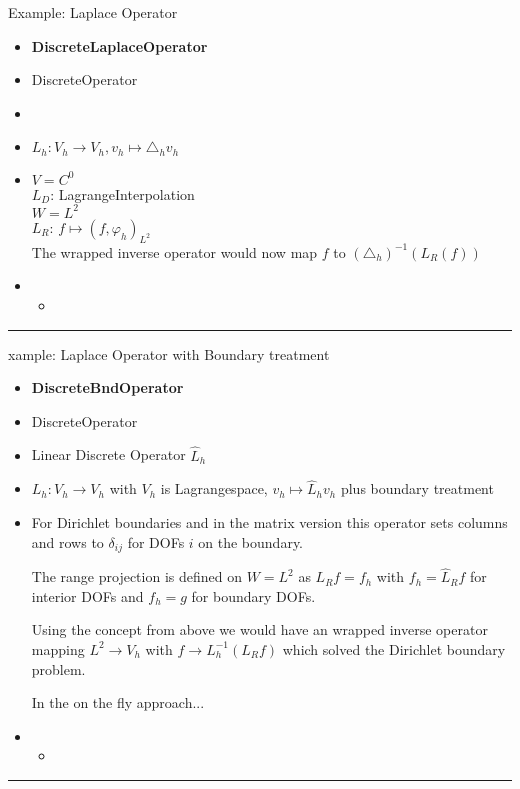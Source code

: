 \documentclass[10pt,a4paper]{article}
\newenvironment{interface}[5]%
{\begin{itemize}
 \item[Interface] {\bf #1}
 \item[is-a] #2 
 \item[argument] #3
 \item[models] #4
 \item[concept] #5
 \item[Methods and typedefs] 
\begin{itemize}}%
{\end{itemize}\end{itemize}\rule{\textwidth}{.4pt}}
\begin{document}
Example: Laplace Operator
\begin{interface}{DiscreteLaplaceOperator}{DiscreteOperator}%
                 {}%
                 {$L_h:V_h\to V_h, v_h\mapsto \triangle_h v_h$}%
                 {%
$V=C^0$ \\
$L_D$: LagrangeInterpolation \\
$W=L^2$ \\
$L_R$: $f\mapsto (f,\varphi_h)_{L^2}$ \\
The wrapped inverse operator would now map $f$ to
$(\triangle_h)^{-1}(L_R(f))$
}
\item
\end{interface}
xample: Laplace Operator with Boundary treatment
\begin{interface}{DiscreteBndOperator}{DiscreteOperator}%
                 {Linear Discrete Operator $\hat{L}_h$}%
                 {$L_h:V_h\to V_h$ with $V_h$ is Lagrangespace, 
                  $v_h\mapsto \hat{L}_hv_h$ plus boundary treatment}
                 {%
For Dirichlet boundaries and
in the matrix version this operator sets columns and rows to $\delta_{ij}$ 
for DOFs $i$ on the boundary.

The range projection is defined on $W=L^2$ as
$L_R f= f_h$ with $f_h=\hat{L}_Rf$ for interior DOFs and 
$f_h=g$ for boundary DOFs. 

Using the concept from above we would
have an wrapped inverse operator mapping $L^2\to V_h$ with
$f\to L_h^{-1}(L_R f)$ which solved the Dirichlet boundary problem.

In the on the fly approach...
}
\item
\end{interface}
\end{document}
